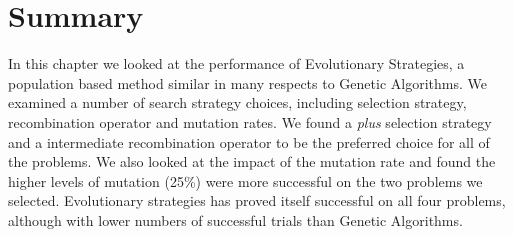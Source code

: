 \section{Summary}
In this chapter we looked at the performance of Evolutionary Strategies, a population based method similar in many respects to Genetic Algorithms. We examined a number of search strategy choices, including selection strategy, recombination operator and mutation rates. We found a \emph{plus} selection strategy and a intermediate recombination operator to be the preferred choice for all of the problems. We also looked at the impact of the mutation rate and found the higher levels of mutation (25\%) were more successful on the two problems we selected. Evolutionary strategies has proved itself successful on all four problems, although with lower numbers of successful trials than Genetic Algorithms. 










